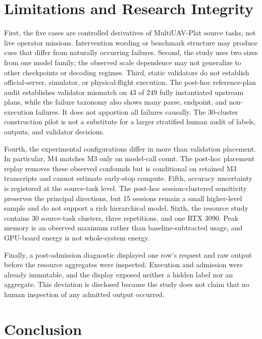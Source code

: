 \documentclass[conference]{IEEEtran}
\newcommand{\Mthree}{\textsc{M3}\xspace}
\newcommand{\Mfour}{\textsc{M4}\xspace}
\begin{document}
\section{Limitations and Research Integrity}

First, the five cases are controlled derivatives of MultiUAV-Plat source tasks,
not live operator missions. Intervention wording or benchmark structure may
produce cues that differ from naturally occurring failures. Second, the study
uses two sizes from one model family; the observed scale dependence may not
generalize to other checkpoints or decoding regimes. Third, static validators
do not establish official-server, simulator, or physical-flight execution.
The post-hoc reference-plan audit establishes validator mismatch on 43 of 249
fully instantiated upstream plans, while the failure taxonomy also shows many
parse, endpoint, and non-execution failures. It does not apportion all failures
causally. The 30-cluster construction pilot is not a substitute for a larger
stratified human audit of labels, outputs, and validator decisions.

Fourth, the experimental configurations differ in more than validation
 placement. In particular, \Mfour matches \Mthree only on model-call count. The
 post-hoc placement replay removes these observed confounds but is conditional
 on retained \Mthree transcripts and cannot estimate early-stop compute.
Fifth, accuracy uncertainty is registered at the source-task level. The
post-hoc session-clustered sensitivity preserves the principal directions, but
15 sessions remain a small higher-level sample and do not support a rich
hierarchical model. Sixth,
the resource study contains 30 source-task clusters, three repetitions, and one
RTX 3090. Peak memory is an observed maximum rather than baseline-subtracted
usage, and GPU-board energy is not whole-system energy.

Finally, a post-admission diagnostic displayed one row's request and raw output
before the resource aggregates were inspected. Execution and admission were
already immutable, and the display exposed neither a hidden label nor an
aggregate. This deviation is disclosed because the study does not claim that
no human inspection of any admitted output occurred.

\section{Conclusion}
\end{document}
